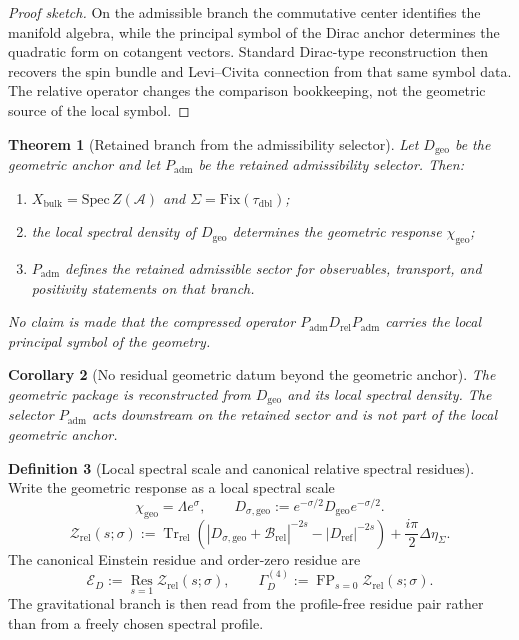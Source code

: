 \documentclass[11pt,a4paper]{article}
\newtheorem{theorem}{Theorem}[section]
\newtheorem{corollary}[theorem]{Corollary}
\theoremstyle{definition}
\newtheorem{definition}[theorem]{Definition}
\theoremstyle{remark}
\newcommand{\Seam}{\Sigma}
\newcommand{\taudbl}{\tau_{\mathrm{dbl}}}
\newcommand{\Xbulk}{X_{\mathrm{bulk}}}
\newcommand{\chigeo}{\chi_{\mathrm{geo}}}
\newcommand{\Padm}{P_{\mathrm{adm}}}
\begin{document}
\begin{proof}[Proof sketch]
On the admissible branch the commutative center identifies the manifold algebra, while the
principal symbol of the Dirac anchor determines the quadratic form on cotangent vectors.
Standard Dirac-type reconstruction then recovers the spin bundle and Levi--Civita connection
from that same symbol data. The relative operator changes the comparison bookkeeping, not the
geometric source of the local symbol.
\end{proof}

\begin{theorem}[Retained branch from the admissibility selector]
\label{thm:retained-branch-from-Padm}
\label{thm:admissible-sector-on-reconstructed-geometry}
\label{thm:full-operator-reconstruction}
Let $D_{\mathrm{geo}}$ be the geometric anchor and let $\Padm$ be the retained
admissibility selector.
Then:
\begin{enumerate}[label=(\roman*), leftmargin=1.5em, topsep=3pt, itemsep=2pt]
\item $\Xbulk=\mathrm{Spec}\,Z(\mathcal A)$ and $\Seam=\mathrm{Fix}(\taudbl)$;
\item the local spectral density of $D_{\mathrm{geo}}$ determines the geometric response
      $\chigeo$;
\item $\Padm$ defines the retained admissible sector for observables, transport,
      and positivity statements on that branch.
\end{enumerate}
No claim is made that the compressed operator $\Padm D_{\mathrm{rel}}\Padm$
carries the local principal symbol of the geometry.
\end{theorem}

\begin{corollary}[No residual geometric datum beyond the geometric anchor]
The geometric package is reconstructed from $D_{\mathrm{geo}}$ and its local spectral density.
The selector $\Padm$ acts downstream on the retained sector and is not part of the
local geometric anchor.
\end{corollary}

\begin{definition}[Local spectral scale and canonical relative spectral residues]
\label{def:local-spectral-scale}
\label{def:canonical-residues}
Write the geometric response as a local spectral scale
\[
\chigeo=\Lambda e^\sigma,
\qquad
D_{\sigma,\mathrm{geo}}:=e^{-\sigma/2}D_{\mathrm{geo}}e^{-\sigma/2}.
\]
\[
\mathcal Z_{\mathrm{rel}}(s;\sigma)
:=
\operatorname{Tr}_{\mathrm{rel}}\!\left(
|D_{\sigma,\mathrm{geo}}+\mathcal B_{\mathrm{rel}}|^{-2s}
-|D_{\mathrm{ref}}|^{-2s}
\right)
+\frac{i\pi}{2}\Delta\eta_\Sigma.
\]
The canonical Einstein residue and order-zero residue are
\[
\mathcal E_D
:=
\operatorname*{Res}_{s=1}\mathcal Z_{\mathrm{rel}}(s;\sigma),
\qquad
\Gamma_D^{(4)}
:=
\operatorname{FP}_{s=0}\mathcal Z_{\mathrm{rel}}(s;\sigma).
\]
The gravitational branch is then read from the profile-free residue pair rather than from a freely
chosen spectral profile.
\end{definition}
\end{document}
